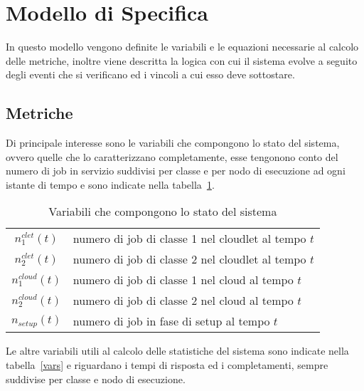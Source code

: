 \section{Modello di Specifica}
In questo modello vengono definite le variabili e le equazioni necessarie al
calcolo delle metriche, inoltre viene descritta la logica con cui il sistema
evolve a seguito degli eventi che si verificano ed i vincoli a cui esso deve
sottostare.
%
%
\subsection{Metriche}
Di principale interesse sono le variabili che compongono lo stato del sistema,
ovvero quelle che lo caratterizzano completamente, esse tengonono conto del
numero di job in servizio suddivisi per classe e per nodo di esecuzione ad ogni
istante di tempo e sono indicate nella tabella~\ref{state}.
%
\begin{table}[!h]
\begin{tabular}{c|l}
{$n_1^{clet}(t)$}  & numero di job di classe 1 nel cloudlet al tempo $t$\\
{$n_2^{clet}(t)$}  & numero di job di classe 2 nel cloudlet al tempo $t$\\
{$n_1^{cloud}(t)$} & numero di job di classe 1 nel cloud al tempo $t$\\
{$n_2^{cloud}(t)$} & numero di job di classe 2 nel cloud al tempo $t$\\
{$n_{setup}(t)$}   & numero di job in fase di setup al tempo $t$\\
\end{tabular}
\centering
\caption{Variabili che compongono lo stato del sistema}
\label{state}
\end{table}
%
Le altre variabili utili al calcolo delle statistiche del sistema sono indicate
nella tabella~\ref{vars} e riguardano i tempi di risposta ed i completamenti,
sempre suddivise per classe e nodo di esecuzione.
%
